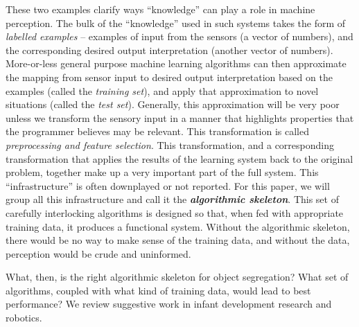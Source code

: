 These two examples clarify ways ``knowledge'' can play a role in
machine perception.  The bulk of the ``knowledge'' used in
such systems takes the form
of {\em labelled examples} -- examples of input from the sensors (a
vector of numbers), and the corresponding desired output
interpretation (another vector of numbers).  
%
More-or-less general
purpose machine learning algorithms can then approximate the mapping
from sensor input to desired output interpretation based on the
examples (called the {\em training set}), and apply that approximation to novel
situations (called the {\em test set}).  
%
Generally, this approximation will be very poor unless we transform
the sensory input in a manner that highlights properties that the
programmer believes may be relevant.  This transformation is called
{\em preprocessing and feature selection}.
%
This transformation, and a corresponding transformation that 
applies the results of the learning system back to the original
problem, together make up a very important part of the full
system.  This ``infrastructure'' is often downplayed or not
reported.
%
%
%
For this paper, we will group all this infrastructure and call it 
the {\bf \em algorithmic skeleton}.
%
%
%
This set of carefully interlocking algorithms is designed so that,
when fed with appropriate training data, it produces a
functional system.  
%
Without the algorithmic skeleton, there would be
no way to make sense of the training data, and without the
data, perception would be crude and uninformed.

What, then, is the right algorithmic skeleton for object
segregation?  What set of algorithms, coupled with what kind of
training data, would lead to best performance?  
%
%
We review suggestive
work in infant development research and robotics.







